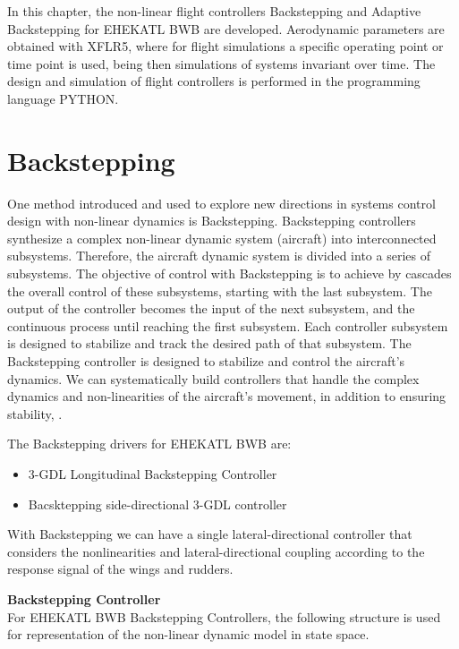 In this chapter, the non-linear flight controllers Backstepping and Adaptive Backstepping for EHEKATL BWB are developed. Aerodynamic parameters are obtained with XFLR5, where for flight simulations a specific operating point or time point is used, being then simulations of systems invariant over time. The design and simulation of flight controllers is performed in the programming language PYTHON.


 \section{Backstepping}

One method introduced and used to explore new directions in systems control design with non-linear dynamics is Backstepping. 
%
Backstepping controllers synthesize a complex non-linear dynamic system (aircraft) into interconnected subsystems. Therefore, the aircraft dynamic system is divided into a series of subsystems.
%
The objective of control with Backstepping is to achieve by cascades the overall control of these subsystems, starting with the last subsystem. The output of the controller becomes the input of the next subsystem, and the continuous process until reaching the first subsystem. 
%
Each controller subsystem is designed to stabilize and track the desired path of that subsystem. 
%
The Backstepping controller is designed to stabilize and control the aircraft’s dynamics. We can systematically build controllers that handle the complex dynamics and non-linearities of the aircraft’s movement, in addition to ensuring stability, \cite{vanGils2015}. 

The Backstepping drivers for EHEKATL BWB are:
\begin{itemize}
    \item 3-GDL Longitudinal Backstepping Controller 
    \item Bacsktepping side-directional 3-GDL controller
\end{itemize}

With Backstepping we can have a single lateral-directional controller that considers the nonlinearities and lateral-directional coupling according to the response signal of the wings and rudders. 

\medskip

\textbf{Backstepping Controller}\\
For EHEKATL BWB Backstepping Controllers, the following structure is used for representation of the non-linear dynamic model in state space.

